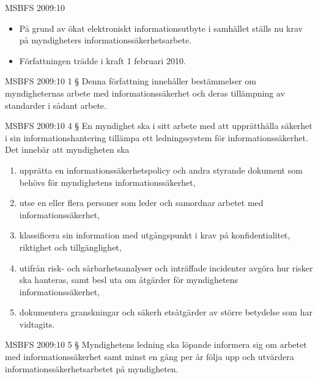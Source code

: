 \documentclass{beamer}
\begin{document}
\begin{frame}{MSBFS 2009:10}
  \begin{itemize}
    \item På grund av ökat elektroniskt informationsutbyte i samhället ställs 
      nu krav på myndigheters informationssäkerhetsarbete.

    \item Författningen trädde i kraft 1 februari 2010.

  \end{itemize}
\end{frame}

\begin{frame}{MSBFS 2009:10}
  1 §   Denna författning innehåller bestämmelser om myndigheternas arbete med 
  informationssäkerhet och deras tillämpning av standarder i sådant arbete.
\end{frame}

\begin{frame}{MSBFS 2009:10}
  4 §   En myndighet ska i sitt arbete med att upprätthålla säkerhet i sin 
  informationshantering tillämpa ett ledningssystem för informationssäkerhet.
  Det innebär att myndigheten ska
  \begin{enumerate}
    \item upprätta en informationssäkerhetspolicy och andra styrande dokument 
      som behövs för myndighetens informationssäkerhet,
    \item utse en eller flera personer som leder och samordnar arbetet med 
      informationssäkerhet,
    \item klassificera sin information med utgångspunkt i krav på 
      konfidentialitet, riktighet och tillgänglighet,
    \item utifrån risk- och sårbarhetsanalyser och inträffade incidenter 
      avgöra hur risker ska hanteras, samt besl uta om åtgärder för 
      myndighetens informationssäkerhet,
    \item dokumentera granskningar och säkerh etsåtgärder av större betydelse 
      som har vidtagits.
  \end{enumerate}
\end{frame}

\begin{frame}{MSBFS 2009:10}
  5 §   Myndighetens ledning ska löpande informera sig om arbetet med 
  informationssäkerhet samt minst en gång per år följa upp och utvärdera 
  informationssäkerhetsarbetet på myndigheten.
\end{frame}
\end{document}
